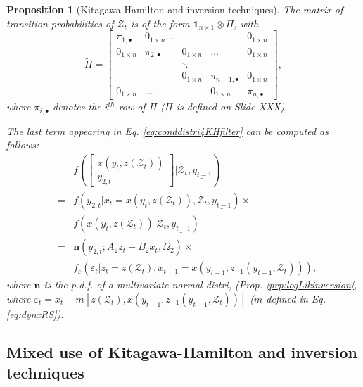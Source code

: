 \documentclass[
  12pt,
]{book}
\newtheorem{proposition}{Proposition}[chapter]
\theoremstyle{definition}
\theoremstyle{definition}
\theoremstyle{definition}
\theoremstyle{definition}
\theoremstyle{remark}
\begin{document}
\begin{proposition}[Kitagawa-Hamilton and inversion techniques]
\protect\hypertarget{prp:mixedKFinversion}{}\label{prp:mixedKFinversion}The matrix of transition probabilities of \(\mathcal{Z}_t\) is of the form \(\mathbf{1}_{n \times 1} \otimes \widetilde{\Pi}\), with
\[
\widetilde{\Pi} =
\left[
\begin{array}{ccccc}
\pi_{1,\bullet} & 0_{1 \times n} \dots & & & 0_{1 \times n} \\
0_{1 \times n} & \pi_{2,\bullet} & 0_{1 \times n} & \dots & 0_{1 \times n} \\
&& \ddots \\
& &  0_{1 \times n} & \pi_{n-1,\bullet} & 0_{1 \times n} \\
0_{1 \times n} &\dots && 0_{1 \times n} & \pi_{n,\bullet}
\end{array}
\right],
\]
where \(\pi_{i,\bullet}\) denotes the \(i^{th}\) row of \(\Pi\) (\(\Pi\) is defined on Slide XXX).

The last term appearing in Eq. \eqref{eq:conddistri4KHfilter} can be computed as follows:
\begin{eqnarray*}
&&f\left(\left[\begin{array}{c}x(y_t,z(\mathcal{Z}_t))\\y_{2,t}\end{array}\right]|\mathcal{Z}_t,\underline{y_{t-1}}\right) \\
&=& f\left(y_{2,t}|x_t=x(y_t,z(\mathcal{Z}_t)),\mathcal{Z}_t,\underline{y_{t-1}}\right) \times\\
&& f\left(x(y_t,z(\mathcal{Z}_t))|\mathcal{Z}_t,\underline{y_{t-1}}\right) \\
&=& \mathbf{n}(y_{2,t};A_2z_t + B_2x_t,\Omega_2) \times\\
&& f_\varepsilon\left(\varepsilon_t|z_t = z(\mathcal{Z}_t),x_{t-1}=x(y_{t-1},z_{-1}(y_{t-1},\mathcal{Z}_t))\right),
\end{eqnarray*}
where \(\mathbf{n}\) is the p.d.f. of a multivariate normal distri, (Prop. \ref{prp:logLikinversion}, where \(\varepsilon_t = x_t - m[z(\mathcal{Z}_t),x(y_{t-1},z_{-1}(y_{t-1},\mathcal{Z}_t))]\) (\(m\) defined in Eq. \eqref{eq:dynxRS}).
\end{proposition}

\hypertarget{mixed-use-of-kitagawa-hamilton-and-inversion-techniques}{%
\subsection{Mixed use of Kitagawa-Hamilton and inversion techniques}\label{mixed-use-of-kitagawa-hamilton-and-inversion-techniques}}
\end{document}
